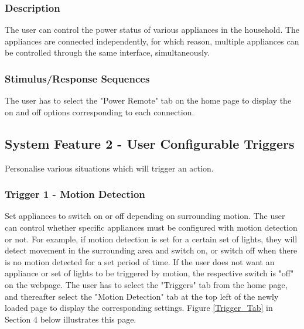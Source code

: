 \documentclass[11pt, a4paper]{article}
\newcounter{subsubsubsection}[subsubsection]
\begin{document}
	\subsubsection{Description}
	The user can control the power status of various appliances in the household. The appliances are connected independently, for which reason, multiple appliances can be controlled through the same interface, simultaneously. 
	\subsubsection{Stimulus/Response Sequences}
	The user has to select the "Power Remote" tab on the home page to display the on and off options corresponding to each connection. 
	
	\subsection{System Feature 2 - User Configurable Triggers} 
	Personalise various situations which will trigger an action.
	\subsubsection{Trigger 1 - Motion Detection}
	Set appliances to switch on or off depending on surrounding motion. 
	The user can control whether specific appliances must be configured with motion detection or not. For example, if motion detection is set for a certain set of lights, they will detect movement in the surrounding area and switch on, or switch off when there is no motion detected for a set period of time. If the user does not want an appliance or set of lights to be triggered by motion, the respective switch is "off" on the webpage. 
	The user has to select the "Triggers" tab from the home page, and thereafter select the "Motion Detection" tab at the top left of the newly loaded page to display the corresponding settings. Figure \ref{Trigger_Tab} in Section 4 below illustrates this page. 
\end{document}
